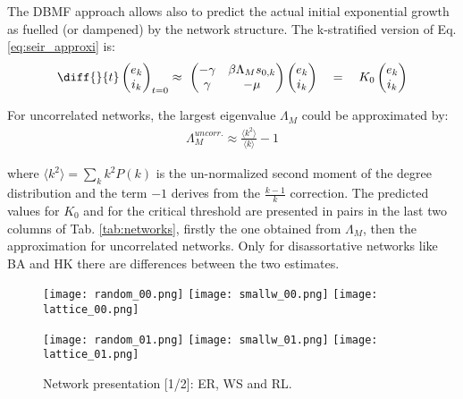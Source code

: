 \documentclass[DIV=12, BCOR=0pt]{scrartcl}  %
\begin{document}
  The DBMF approach allows also to predict the actual initial exponential growth as fuelled (or dampened) by the network structure. The k-stratified version of Eq. \ref{eq:seir_approxi} is:
  \begin{align}
    	\diff{}{t}
	  \begin{pmatrix}
	  	e_k \\
	  	i_k
	  \end{pmatrix}_{t=0}
	  \approx \
	  \begin{pmatrix}
	  	- \gamma & \beta \Lambda_M s_{0,k} \\
	  	\gamma & - \mu
	  \end{pmatrix}
	  \begin{pmatrix}
	  	e_k \\
	  	i_k
	  \end{pmatrix}
	  \quad = \quad K_0 %
	  \begin{pmatrix}
	  	e_k \\
	  	i_k
	  \end{pmatrix} %
	  \label{eq:seir_approxiDBMF}
  \end{align}
  
  For uncorrelated networks, the largest eigenvalue $\Lambda_M$ could be approximated by:
  \begin{align}
  	\Lambda_M^{uncorr.} \approx \frac{\langle k^2 \rangle}{\langle k \rangle} - 1
  \end{align}

  where $\langle k^2 \rangle = \sum_k k^2 P(k)$ is the un-normalized second moment of the degree distribution and the term $- 1$ derives from the $\frac{k-1}{k}$ correction.
  The predicted values for $K_0$ and for the critical threshold are presented in pairs in the last two columns of Tab. \ref{tab:networks}, firstly the one obtained from $\Lambda_M$, then the approximation for uncorrelated networks. Only for disassortative networks like BA and HK there are differences between the two estimates. 
 	
  

  \clearpage
  \begin{figure}[h!]
  	\centering
  	\texttt{[image: random\_00.png]}
  	\texttt{[image: smallw\_00.png]}
  	\texttt{[image: lattice\_00.png]}
  	
  	\texttt{[image: random\_01.png]}
  	\texttt{[image: smallw\_01.png]}
  	\texttt{[image: lattice\_01.png]}
  	\caption{Network presentation [1/2]: ER, WS and RL.}
  	\label{fig:networks0}
  \end{figure}  	
  
\end{document}
